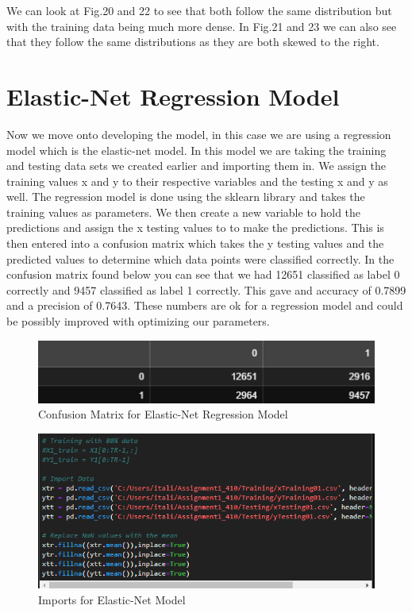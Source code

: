 \documentclass[conference]{IEEEtran}
\begin{document}
We can look at Fig.20 and 22 to see that both follow the same distribution but with the training data being much more dense. In Fig.21 and 23 we can also see that they follow the same distributions as they are both skewed to the right.

\section{Elastic-Net Regression Model}
Now we move onto developing the model, in this case we are using a regression model which is the elastic-net model. In this model we are taking the training and testing data sets we created earlier and importing them in. We assign the training values x and y to their respective variables and the testing x and y as well. The regression model is done using the sklearn library and takes the training values as parameters. We then create a new variable to hold the predictions and assign the x testing values to to make the predictions. This is then entered into a confusion matrix which takes the y testing values and the predicted values to determine which data points were classified correctly. In the confusion matrix found below you can see that we had 12651 classified as label 0 correctly and 9457 classified as label 1 correctly. This gave and accuracy of 0.7899 and a precision of 0.7643. These numbers are ok for a regression model and could be possibly improved with optimizing our parameters.

\begin{figure}[h]
  \centering
  \includegraphics[width=\linewidth]{confusionElastic.png}
  \caption{Confusion Matrix for Elastic-Net Regression Model}
\end{figure}

\begin{figure}[h]
  \centering
  \includegraphics[width=\linewidth]{elasticNetImport.png}
  \caption{Imports for Elastic-Net Model}
\end{figure}
\end{document}
